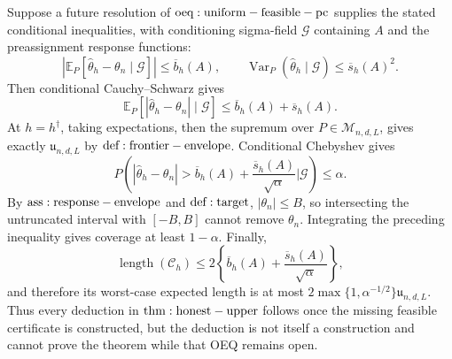 Suppose a future resolution of \({\rm oeq:uniform-feasible-pc}\) supplies the stated conditional inequalities, with conditioning sigma-field \(\mathcal G\) containing \(A\) and the preassignment response functions:
\[
 \left|\mathbb E_P[\widehat\theta_h-\theta_n\mid\mathcal G]\right|\leq\overline b_h(A),
 \qquad
 \operatorname{Var}_P(\widehat\theta_h\mid\mathcal G)\leq\overline s_h(A)^2.
\]
Then conditional Cauchy--Schwarz gives
\[
 \mathbb E_P[|\widehat\theta_h-\theta_n|\mid\mathcal G]
 \leq \overline b_h(A)+\overline s_h(A).
\]
At \(h=h^\dagger\), taking expectations, then the supremum over \(P\in\mathcal M_{n,d,L}\), gives exactly \(\mathfrak u_{n,d,L}\) by \({\rm def:frontier-envelope}\).  Conditional Chebyshev gives
\[
 P\!\left(
 |\widehat\theta_h-\theta_n|>
 \overline b_h(A)+\frac{\overline s_h(A)}{\sqrt\alpha}
 \mathrel{\Big|}\mathcal G
 \right)\leq\alpha.
\]
By \({\rm ass:response-envelope}\) and \({\rm def:target}\), \(|\theta_n|\leq B\), so intersecting the untruncated interval with \([-B,B]\) cannot remove \(\theta_n\).  Integrating the preceding inequality gives coverage at least \(1-\alpha\).  Finally,
\[
 \operatorname{length}(\mathcal C_h)
 \leq 2\left\{\overline b_h(A)+\frac{\overline s_h(A)}{\sqrt\alpha}\right\},
\]
and therefore its worst-case expected length is at most \(2\max\{1,\alpha^{-1/2}\}\mathfrak u_{n,d,L}\).  Thus every deduction in \({\rm thm:honest-upper}\) follows once the missing feasible certificate is constructed, but the deduction is not itself a construction and cannot prove the theorem while that OEQ remains open.